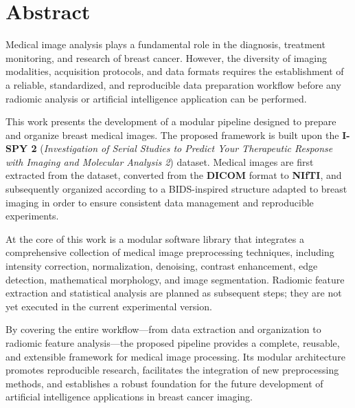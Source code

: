 \documentclass[12pt,a4paper]{report}
\begin{document}
	\newpage
	\section*{Abstract}

Medical image analysis plays a fundamental role in the diagnosis, treatment monitoring, and research of breast cancer. However, the diversity of imaging modalities, acquisition protocols, and data formats requires the establishment of a reliable, standardized, and reproducible data preparation workflow before any radiomic analysis or artificial intelligence application can be performed.

This work presents the development of a modular pipeline designed to prepare and organize breast medical images. The proposed framework is built upon the \textbf{I-SPY 2} (\textit{Investigation of Serial Studies to Predict Your Therapeutic Response with Imaging and Molecular Analysis 2}) dataset. Medical images are first extracted from the dataset, converted from the \textbf{DICOM} format to \textbf{NIfTI}, and subsequently organized according to a BIDS-inspired structure adapted to breast imaging in order to ensure consistent data management and reproducible experiments.

At the core of this work is a modular software library that integrates a comprehensive collection of medical image preprocessing techniques, including intensity correction, normalization, denoising, contrast enhancement, edge detection, mathematical morphology, and image segmentation. Radiomic feature extraction and statistical analysis are planned as subsequent steps; they are not yet executed in the current experimental version.

By covering the entire workflow—from data extraction and organization to radiomic feature analysis—the proposed pipeline provides a complete, reusable, and extensible framework for medical image processing. Its modular architecture promotes reproducible research, facilitates the integration of new preprocessing methods, and establishes a robust foundation for the future development of artificial intelligence applications in breast cancer imaging.

	\newpage
	
\end{document}
